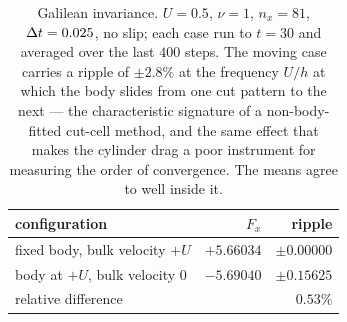 \begin{table}[h]
\centering\small
\begin{tabular}{@{}lrr@{}}
\toprule
configuration & $F_x$ & ripple \\
\midrule
fixed body, bulk velocity $+U$  & $+5.66034$ & $\pm0.00000$ \\
body at $+U$, bulk velocity $0$ & $-5.69040$ & $\pm0.15625$ \\
\midrule
relative difference & \multicolumn{2}{r}{$0.53\%$} \\
\bottomrule
\end{tabular}
\caption{Galilean invariance. $U=0.5$, $\nu=1$, $n_x=81$, $\Delta t=0.025$, no slip; each case run to
$t=30$ and averaged over the last $400$ steps. The moving case carries a ripple of $\pm2.8\%$ at
the frequency $U/h$ at which the body slides from one cut pattern to the next --- the
characteristic signature of a non-body-fitted cut-cell method, and the same effect that makes the
cylinder drag a poor instrument for measuring the order of convergence. The means agree to well
inside it.}
\label{tab:galilean}
\end{table}
